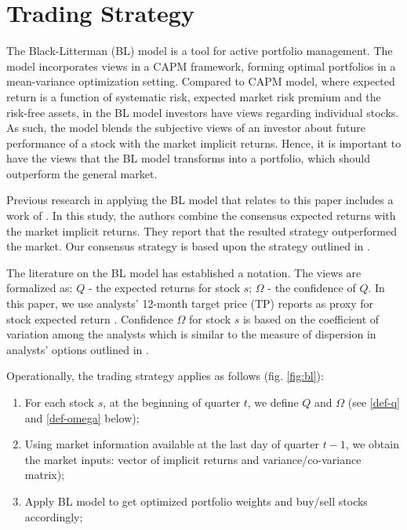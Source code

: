 \documentclass{article}\usepackage[]{graphicx}\usepackage[]{color}
\begin{document}
\section{Trading Strategy}
\label{sec:trading}
The Black-Litterman (BL) model is a tool for  active portfolio management\citep{black1992}. The model incorporates views in a CAPM framework, forming optimal portfolios in a mean-variance optimization setting. Compared to CAPM model, where expected return is a function of systematic risk, expected market risk premium and the risk-free assets, in the BL model investors have views regarding individual stocks. As such, the model blends the subjective views of an investor about future performance of a stock with the market implicit returns. Hence, it is important to have the views that the BL model transforms into a portfolio, which should outperform the general market.

Previous research in applying the BL model that relates to this paper includes a work of \cite{da2011bl}. In this study, the authors combine the consensus expected returns with the market implicit returns. They report that the resulted strategy outperformed the market. Our consensus strategy is based upon the strategy outlined in \cite{da2011bl}.


The literature on the BL model has established a notation. The views are formalized as: $Q$ - the expected returns for stock $s$; $\Omega$ - the confidence of $Q$. In this paper, we use analysts' 12-month target price (TP) reports as proxy for stock expected return \citep{da2011bl}. Confidence $\Omega$ for stock $s$ is based on the coefficient of variation  among the analysts which is similar to the measure of dispersion in analysts' options outlined in \cite{diether2002}.


Operationally, the trading strategy applies as follows (fig. \ref{fig:bl}):
\begin{enumerate}
\item For each stock $s$, at the beginning of quarter $t$,   we define $Q$ and $\Omega$ (see \ref{def-q} and \ref{def-omega} below);

\item Using market information available at the last day of quarter $t-1$, we obtain the market inputs: vector of implicit returns and variance/co-variance matrix);

\item Apply BL model to get  optimized portfolio weights and buy/sell stocks accordingly;

\end{enumerate}
\end{document}
